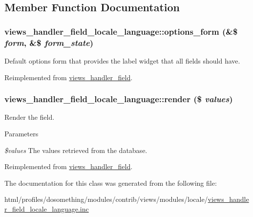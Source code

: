 \subsection{Member Function Documentation}
\hypertarget{classviews__handler__field__locale__language_ae1a402a2c1186b055d66d6421d10182c}{
\subsubsection[{options\_\-form}]{\setlength{\rightskip}{0pt plus 5cm}views\_\-handler\_\-field\_\-locale\_\-language::options\_\-form (\&\$ {\em form}, \/  \&\$ {\em form\_\-state})}}
\label{classviews__handler__field__locale__language_ae1a402a2c1186b055d66d6421d10182c}
Default options form that provides the label widget that all fields should have. 

Reimplemented from \hyperlink{classviews__handler__field_a0435d161922b7b4b84f02a2e79bb947a}{views\_\-handler\_\-field}.\hypertarget{classviews__handler__field__locale__language_a9aee281e240225b4a6f4465afcb8cdbf}{
\subsubsection[{render}]{\setlength{\rightskip}{0pt plus 5cm}views\_\-handler\_\-field\_\-locale\_\-language::render (\$ {\em values})}}
\label{classviews__handler__field__locale__language_a9aee281e240225b4a6f4465afcb8cdbf}
Render the field.


\begin{DoxyParams}{Parameters}
\item[{\em \$values}]The values retrieved from the database. \end{DoxyParams}


Reimplemented from \hyperlink{classviews__handler__field_a82ff951c5e9ceb97b2eab86f880cbc1e}{views\_\-handler\_\-field}.

The documentation for this class was generated from the following file:\begin{DoxyCompactItemize}
\item 
html/profiles/dosomething/modules/contrib/views/modules/locale/\hyperlink{views__handler__field__locale__language_8inc}{views\_\-handler\_\-field\_\-locale\_\-language.inc}\end{DoxyCompactItemize}
